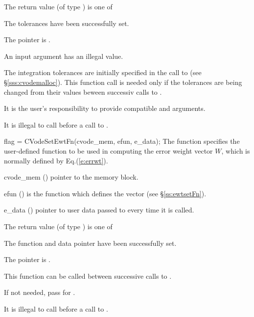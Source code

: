 {
  The return value  (of type ) is one of
  \begin{args}
  \item[\Id{CV\_SUCCESS}] 
    The tolerances have been successfully set.
  \item[\Id{CV\_MEM\_NULL}]
    The  pointer is .
  \item[\Id{CV\_ILL\_INPUT}]
    An input argument has an illegal value.
  \end{args}
}
{
  The integration tolerances are initially specified in the call
  to  (see \S\ref{sss:cvodemalloc}). This function call is
  needed only if the tolerances are being changed from their values beween
  successiv calls to .

  {\warn}It is the user's responsibility to provide compatible  and
   arguments.

  It is illegal to call  before a call to 
  .
}
{
flag = CVodeSetEwtFn(cvode\_mem, efun, e\_data);
}
{
  The function  specifies the user-defined function
  to be used in computing the error weight vector $W$, which is normally
  defined by Eq.(\ref{e:errwt}).
}
{
  \begin{args}
  \item[cvode\_mem] ()
    pointer to the {\cvodes} memory block.
  \item[efun] () 
    is the {\C} function which defines the  vector (see \S\ref{ss:ewtsetFn}).
  \item[e\_data] ()
    pointer to user data passed to  every time it is called.
  \end{args}
}
{
  The return value  (of type ) is one of
  \begin{args}
  \item[\Id{CV\_SUCCESS}] 
     The function  and data pointer  have been successfully set.
  \item[\Id{CV\_MEM\_NULL}]
    The  pointer is .
  \end{args}
}
{
  This function can be called between successive calls to .
  
  If not needed, pass  for .

  {\warn}It is illegal to call  before a call to .
}

